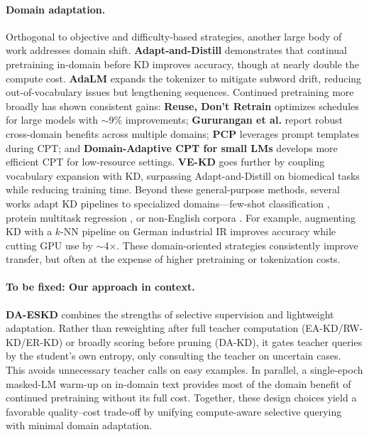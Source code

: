 \paragraph{Domain adaptation.}
Orthogonal to objective and difficulty-based strategies, another large body of work addresses domain shift. 
\textbf{Adapt-and-Distill} \cite{adaptanddistill} demonstrates that continual pretraining in-domain before KD improves accuracy, though at nearly double the compute cost. 
\textbf{AdaLM} expands the tokenizer to mitigate subword drift, reducing out-of-vocabulary issues but lengthening sequences. Continued pretraining more broadly has shown consistent gains: 
\textbf{Reuse, Don’t Retrain} \cite{reuse2024} optimizes schedules for large models with $\sim$9\% improvements; 
\textbf{Gururangan et al.} \cite{gururangan2020don} report robust cross-domain benefits across multiple domains; 
\textbf{PCP} \cite{pcp2023} leverages prompt templates during CPT; and \textbf{Domain-Adaptive CPT for small LMs} \cite{domainadaptive2025} develops more efficient CPT for low-resource settings. 
\textbf{VE-KD} \cite{vekd2024} goes further by coupling vocabulary expansion with KD, surpassing Adapt-and-Distill on biomedical tasks while reducing training time. 
Beyond these general-purpose methods, several works adapt KD pipelines to specialized domains—few-shot classification \cite{adasent2023}, protein multitask regression \cite{selfprot2024}, or non-English corpora \cite{germanprocess2023}. For example, augmenting KD with a $k$-NN pipeline on German industrial IR improves accuracy while cutting GPU use by $\sim$4$\times$. 
These domain-oriented strategies consistently improve transfer, but often at the expense of higher pretraining or tokenization costs.

\paragraph{To be fixed: Our approach in context.}
\textbf{DA-ESKD} combines the strengths of selective supervision and lightweight adaptation. Rather than reweighting after full teacher computation (EA-KD/RW-KD/ER-KD) or broadly scoring before pruning (DA-KD), it gates teacher queries by the student’s own entropy, only consulting the teacher on uncertain cases. This avoids unnecessary teacher calls on easy examples. In parallel, a single-epoch masked-LM warm-up on in-domain text provides most of the domain benefit of continued pretraining without its full cost. Together, these design choices yield a favorable quality--cost trade-off by unifying compute-aware selective querying with minimal domain adaptation.
